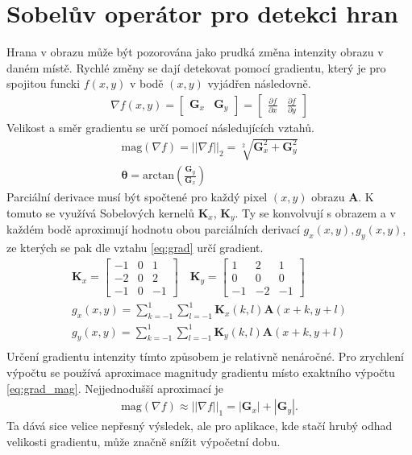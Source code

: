 \documentclass[twoside]{ctuthesis}
\newcommand{\tl}[1]{$\mathbf{#1}$}
\begin{document}
\section{Sobelův operátor pro detekci hran}
\label{subsec:sobel}
Hrana v obrazu může být pozorována jako prudká změna intenzity obrazu v daném místě. Rychlé změny se dají detekovat pomocí gradientu, který je pro spojitou funcki $f(x,y)$ v bodě $(x,y)$ vyjádřen následovně. 
\begin{align}
    \nabla f(x,y) =  \begin{bmatrix} \mathbf{G}_x & \mathbf{G}_y \end{bmatrix} = \begin{bmatrix} \frac{\partial f}{\partial x} & \frac{\partial f}{\partial y} \end{bmatrix} \label{eq:grad}
\end{align}
Velikost a směr gradientu se určí pomocí následujících vztahů.
\begin{align}
    \text{mag}(\nabla f) = ||\nabla f ||_2 = \sqrt[2]{\mathbf{G}_x ^2 + \mathbf{G}_y ^2} \label{eq:grad_mag} \\
    \boldsymbol{\theta} = \text{arctan} (\frac{\mathbf{G}_y}{\mathbf{G}_x})
\end{align}
Parciální derivace musí být spočtené pro každý pixel $(x,y)$ obrazu \tl{A}. K tomuto se využívá Sobelových kernelů $\mathbf{K}_x$, $\mathbf{K}_y$. Ty se konvolvují s obrazem a v každém bodě aproximují hodnotu obou parciálních derivací $g_x(x,y), g_y(x,y)$, ze kterých se pak dle vztahu \ref{eq:grad} určí gradient.
\begin{align}
    \mathbf{K}_x = \begin{bmatrix} -1 & 0 & 1 \\ -2 & 0 &2 \\ -1 & 0 & -1 \end{bmatrix} \quad \mathbf{K}_y = \begin{bmatrix} 1 & 2 & 1 \\ 0 & 0 & 0 \\ -1 & -2 & -1 \end{bmatrix} \\
    g_x(x,y) = \sum_{k = -1}^1 \sum_{l = -1}^1 \mathbf{K}_x(k,l)\mathbf{A}(x+k, y+l) \\
    g_y(x,y) = \sum_{k = -1}^1 \sum_{l = -1}^1 \mathbf{K}_y(k,l)\mathbf{A}(x+k, y+l) \\
\end{align}
Určení gradientu intenzity tímto způsobem je relativně nenáročné. Pro zrychlení výpočtu se používá aproximace magnitudy gradientu místo exaktního výpočtu \ref{eq:grad_mag}. Nejjednodušší aproximací je 
\begin{align}
    \text{mag}(\nabla f) \approx ||\nabla f ||_1 = |\mathbf{G}_x| + |\mathbf{G}_y|.  
\end{align}
Ta dává sice velice nepřesný výsledek, ale pro aplikace, kde stačí hrubý odhad velikosti gradientu, může značně snížit výpočetní dobu.\cite{gao2010improved,jin2009edge}
\end{document}
